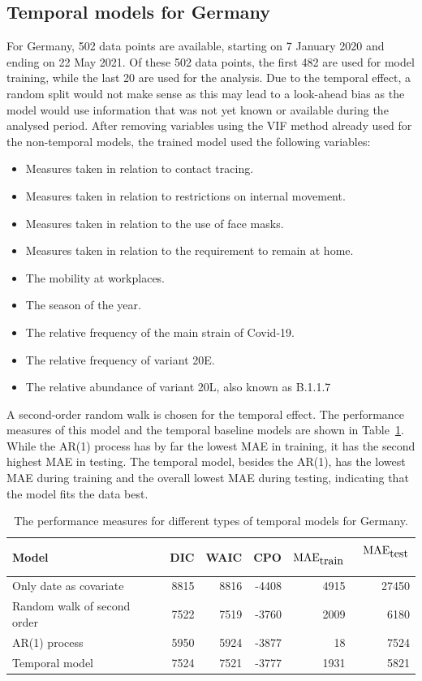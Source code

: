 \subsection{Temporal models for Germany}
For Germany, 502 data points are available, starting on 7 January 2020 and ending on 22 May 2021. Of these 502 data points, the first 482 are used for model training, while the last 20 are used for the analysis. Due to the temporal effect, a random split would not make sense as this may lead to a look-ahead bias as the model would use information that was not yet known or available during the analysed period. After removing variables using the VIF method already used for the non-temporal models, the trained model used the following variables:
\begin{itemize}
    \item Measures taken in relation to contact tracing.
    \item Measures taken in relation to restrictions on internal movement.
    \item Measures taken in relation to the use of face masks.
    \item Measures taken in relation to the requirement to remain at home.
    \item The mobility at workplaces.
    \item The season of the year.
    \item The relative frequency of the main strain of Covid-19.
    \item The relative frequency of variant 20E.
    \item The relative abundance of variant 20L, also known as B.1.1.7
\end{itemize}
A second-order random walk is chosen for the temporal effect. The performance measures of this model and the temporal baseline models are shown in Table~\ref{germany_temporal}. While the AR(1) process has by far the lowest MAE in training, it has the second highest MAE in testing. The temporal model, besides the AR(1), has the lowest MAE during training and the overall lowest MAE during testing, indicating that the model fits the data best.
\begin{table}[H] 
\caption{The performance measures for different types of temporal models for Germany. \label{germany_temporal}}
\begin{tabular}{l r r r r r}
\toprule
\textbf{Model}	& \textbf{DIC}	& \textbf{WAIC} & \textbf{CPO} & \textbf{$\hbox{MAE}_{\hbox{train}}$} & \textbf{$\hbox{MAE}_{\hbox{test}}$}\ \\
\midrule
Only date as covariate & 8815 & 8816 & -4408 & 4915 & 27450 \\
Random walk of second order & 7522 & 7519 & -3760 & 2009 & 6180 \\
AR(1) process & 5950 & 5924 & -3877 & 18 & 7524 \\
Temporal model &  7524 & 7521 & -3777 & 1931 & 5821 \\
\bottomrule
\end{tabular}
\end{table}
